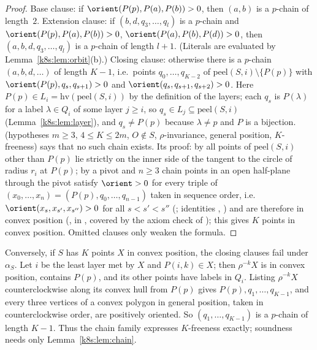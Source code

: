 \begin{proof}
Base clause: if $\orient(P(p),P(a),P(b))>0$, then $(a,b)$ is a $p$-chain of length~$2$. Extension clause: if
$(b,d,q_3,\dots,q_l)$ is a $p$-chain and $\orient(P(p),P(a),P(b))>0$, $\orient(P(a),P(b),P(d))>0$, then
$(a,b,d,q_3,\dots,q_l)$ is a $p$-chain of length $l+1$. (Literals are evaluated by Lemma~\ref{k8s:lem:orbit}(b).)
Closing clause: otherwise there is a $p$-chain $(a,b,d,\dots)$ of length $K-1$, i.e.\ points $q_0,\dots,q_{K-2}$ of
$\mathrm{peel}(S,i)\setminus\{P(p)\}$ with $\orient(P(p),q_s,q_{s+1})>0$ and $\orient(q_s,q_{s+1},q_{s+2})>0$. Here
$P(p)\in L_i=\mathrm{hv}(\mathrm{peel}(S,i))$ by the definition of the layers; each $q_s$ is $P(\lambda)$ for a label
$\lambda\in Q_i$ of some layer $j\ge i$, so $q_s\in L_j\subseteq\mathrm{peel}(S,i)$ (Lemma~\ref{k8s:lem:layer}), and
$q_s\ne P(p)$ because $\lambda\ne p$ and $P$ is a bijection.  (hypotheses
$m\ge3$, $4\le K\le2m$, $O\notin S$, $\rho$-invariance, general position, $K$-freeness) says that no such chain exists.
Its proof: by  all points of $\mathrm{peel}(S,i)$ other than $P(p)$ lie strictly on the inner side of
the tangent to the circle of radius $r_i$ at $P(p)$; by  a pivot and $n\ge3$ chain points in an
open half-plane through the pivot satisfy $\orient>0$ for every triple of $(x_0,\dots,x_n)=(P(p),q_0,\dots,q_{n-1})$
taken in sequence order, i.e.\ $\orient(x_s,x_{s'},x_{s''})>0$ for all $s<s'<s''$ (; identities
, ) and are therefore in convex position
(, in ,
covered by the axiom check of ); this gives $K$ points in convex position. Omitted
clauses only weaken the formula.
\end{proof}

\begin{remark}\label{k8s:rem:complete}
Conversely, if $S$ has $K$ points $X$ in convex position, the closing clauses fail under $\alpha_S$. Let $i$ be the least
layer met by $X$ and $P(i,k)\in X$; then $\rho^{-k}X$ is in convex position, contains $P(p)$, and its other points have
labels in $Q_i$. Listing $\rho^{-k}X$ counterclockwise along its convex hull from $P(p)$ gives $P(p),q_1,\dots,q_{K-1}$,
and every three vertices of a convex polygon in general position, taken in counterclockwise order, are positively
oriented. So $(q_1,\dots,q_{K-1})$ is a $p$-chain of length $K-1$. Thus the chain family expresses $K$-freeness exactly;
soundness needs only Lemma~\ref{k8s:lem:chain}.
\end{remark}

